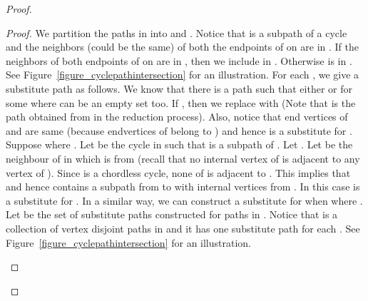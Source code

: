 \begin{proof}
\begin{proof}
We partition the paths in  into  and . 
Notice that  is a subpath of a cycle  and the neighbors (could be the same) 
of  both the endpoints  of  on  are in 
. If the neighbors of both endpoints of   on  are in , then we include  in .  Otherwise  is in . 
See Figure~\ref{figure_cyclepathintersection} for an illustration. 
For each , we give a substitute path 
as follows. 
We know that there is a path  such that  either  or  for some  where  can be 
an empty set too.
If , then we replace  with  
(Note that  is the path obtained from  in the reduction process). Also, notice that end vertices of  and  are same 
(because endvertices of  belong to ) 
and hence  is a substitute for 
. Suppose  where . Let  be the cycle in  such that  is a subpath of . 
Let . Let  be the neighbour of  in  which is from  (recall that 
 no internal vertex of  is adjacent to  any vertex of ).  
Since 
 is a chordless cycle, none of  is adjacent to . This implies that   and hence 
 contains a subpath  from  to  with internal vertices from . In this case 
 is a substitute for . In a similar way, we can construct a substitute for  when   where . 
Let  be the set of substitute paths constructed for paths in . Notice that  
is a collection of vertex disjoint paths in  and it has one substitute path for each . 
See Figure~\ref{figure_cyclepathintersection} for an illustration. 




\begin{figure}

\begin{subfigure}[b]{0.5\textwidth}
        \centering
{}
\end{subfigure}
\end{figure}
\end{proof}
\end{proof}
